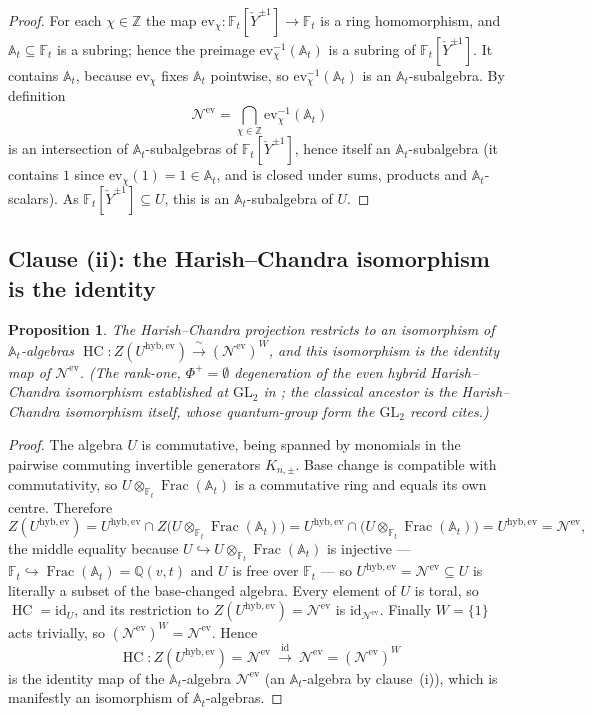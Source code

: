 \documentclass[11pt]{article}
\newtheorem{proposition}{Proposition}
\newcommand{\At}{\mathbb{A}_t}
\newcommand{\Ft}{\mathbb{F}_t}
\newcommand{\Nev}{\mathcal N^{\mathrm{ev}}}
\newcommand{\Uev}{U^{\mathrm{hyb,ev}}}
\newcommand{\HC}{\operatorname{HC}}
\newcommand{\Yc}{\check Y}
\newcommand{\Z}{\mathbb Z}
\newcommand{\ev}{\mathrm{ev}}
\begin{document}
\begin{proof}
For each $\chi\in\Z$ the map $\ev_\chi\colon\Ft[\Yc^{\pm1}]\to\Ft$ is a ring
homomorphism, and $\At\subseteq\Ft$ is a subring; hence the preimage
$\ev_\chi^{-1}(\At)$ is a subring of $\Ft[\Yc^{\pm1}]$. It contains $\At$,
because $\ev_\chi$ fixes $\At$ pointwise, so $\ev_\chi^{-1}(\At)$ is an
$\At$-subalgebra. By definition
\[
  \Nev=\bigcap_{\chi\in\Z}\ev_\chi^{-1}(\At)
\]
is an intersection of $\At$-subalgebras of $\Ft[\Yc^{\pm1}]$, hence itself an
$\At$-subalgebra (it contains $1$ since $\ev_\chi(1)=1\in\At$, and is closed
under sums, products and $\At$-scalars). As $\Ft[\Yc^{\pm1}]\subseteq U$, this
is an $\At$-subalgebra of $U$.
\end{proof}

\subsection{Clause (ii): the Harish--Chandra isomorphism is the identity}

\begin{proposition}
The Harish--Chandra projection restricts to an isomorphism of $\At$-algebras
$\HC\colon Z(\Uev)\xrightarrow{\ \sim\ }(\Nev)^{W}$, and this isomorphism is the
identity map of $\Nev$. (The rank-one, $\Phi^{+}=\emptyset$ degeneration of the
even hybrid Harish--Chandra isomorphism established at $\mathrm{GL}_2$ in
\cite{SandboxGL2}; the classical ancestor is the Harish--Chandra isomorphism
itself, whose quantum-group form the $\mathrm{GL}_2$ record cites.)
\end{proposition}

\begin{proof}
The algebra $U$ is commutative, being spanned by monomials in the pairwise
commuting invertible generators $K_{n,\pm}$. Base change is compatible with
commutativity, so $U\otimes_{\Ft}\operatorname{Frac}(\At)$ is a commutative ring
and equals its own centre. Therefore
\[
  Z(\Uev)=\Uev\cap Z\bigl(U\otimes_{\Ft}\operatorname{Frac}(\At)\bigr)
        =\Uev\cap\bigl(U\otimes_{\Ft}\operatorname{Frac}(\At)\bigr)
        =\Uev=\Nev,
\]
the middle equality because $U\hookrightarrow U\otimes_{\Ft}\operatorname{Frac}(\At)$
is injective --- $\Ft\hookrightarrow\operatorname{Frac}(\At)=\mathbb Q(v,t)$ and $U$ is
free over $\Ft$ --- so $\Uev=\Nev\subseteq U$ is literally a subset of the base-changed
algebra.
Every element of $U$ is toral, so $\HC=\mathrm{id}_U$, and its restriction to
$Z(\Uev)=\Nev$ is $\mathrm{id}_{\Nev}$. Finally $W=\{1\}$ acts trivially, so
$(\Nev)^{W}=\Nev$. Hence
\[
  \HC\colon Z(\Uev)=\Nev\ \xrightarrow{\ \mathrm{id}\ }\ \Nev=(\Nev)^{W}
\]
is the identity map of the $\At$-algebra $\Nev$ (an $\At$-algebra by clause~(i)),
which is manifestly an isomorphism of $\At$-algebras.
\end{proof}
\end{document}
